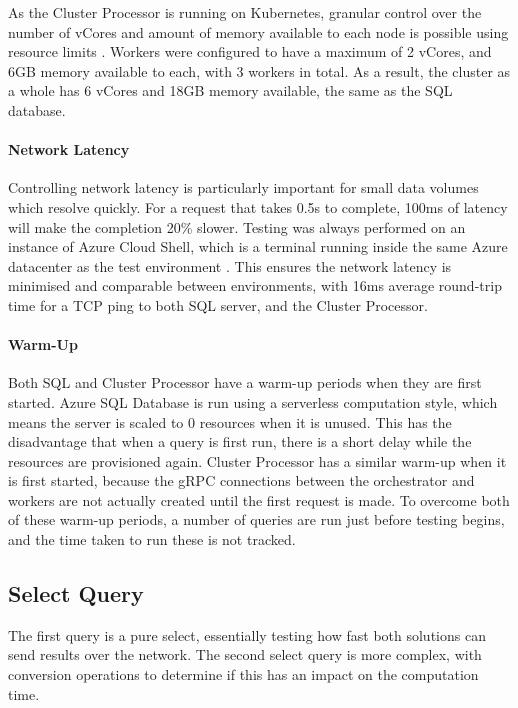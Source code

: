 As the Cluster Processor is running on Kubernetes, granular control over the number of vCores and amount of memory available to each node is possible using resource limits \cite{k8sapi}. Workers were configured to have a maximum of 2 vCores, and 6GB memory available to each, with 3 workers in total. As a result, the cluster as a whole has 6 vCores and 18GB memory available, the same as the SQL database.

\paragraph{Network Latency}
Controlling network latency is particularly important for small data volumes which resolve quickly. For a request that takes 0.5s to complete, 100ms of latency will make the completion 20\% slower. Testing was always performed on an instance of Azure Cloud Shell, which is a terminal running inside the same Azure datacenter as the test environment \cite{azurecloudshell}. This ensures the network latency is minimised and comparable between environments, with 16ms average round-trip time for a TCP ping to both SQL server, and the Cluster Processor.

\paragraph{Warm-Up}
Both SQL and Cluster Processor have a warm-up periods when they are first started. Azure SQL Database is run using a serverless computation style, which means the server is scaled to 0 resources when it is unused. This has the disadvantage that when a query is first run, there is a short delay while the resources are provisioned again. Cluster Processor has a similar warm-up when it is first started, because the gRPC connections between the orchestrator and workers are not actually created until the first request is made. To overcome both of these warm-up periods, a number of queries are run just before testing begins, and the time taken to run these is not tracked.

\subsection{Select Query}
The first query is a pure select, essentially testing how fast both solutions can send results over the network. 
The second select query is more complex, with conversion operations to determine if this has an impact on the computation time. 

